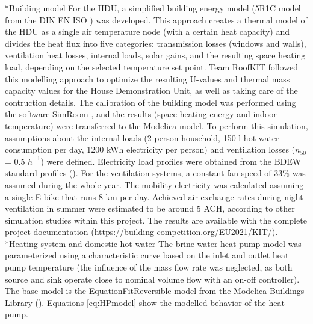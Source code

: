 \documentclass[twocolumn, a4paper,10pt]{article}
\makeatletter
\renewcommand\subsection{\@startsection{subsection}{1}{\z@}{\z@}{\z@}{\normalfont\normalsize\bfseries}}
\renewcommand\subsection{\@startsection{subsection}{1}{\z@}{\z@}{0.1pt}{\normalfont\normalsize\bfseries}}
\makeatother
\begin{document}
\subsection*{Building model}
For the HDU, a simplified building energy model (5R1C model from the DIN EN ISO \citet{DIN13790}) was developed. This approach creates a thermal model of the HDU as a single air temperature node (with a certain heat capacity) and divides the heat flux into five categories: transmission losses (windows and walls), ventilation heat losses, internal loads, solar gains, and the resulting space heating load, depending on the selected temperature set point. Team RoofKIT followed this modelling approach to optimize the resulting U-values and thermal mass capacity values for the House Demonstration Unit, as well as taking care of the contruction details. The calibration of the building model was performed using the software SimRoom \citeyear {SimRoom2022}, and the results (space heating energy and indoor temperature) were transferred to the Modelica model. To perform this simulation, assumptions about the internal loads (2-person household, 150 l hot water consumption per day, 1200 kWh electricity per person) and ventilation losses ($n_{50}$ = 0.5 $h^{-1}$) were defined. Electricity load profiles were obtained from the BDEW standard profiles (\citet{BDEW2002}). For the ventilation systems, a constant fan speed of 33\% was assumed during the whole year. The mobility electricity was calculated assuming a single E-bike that runs 8 km per day. Achieved air exchange rates during night ventilation in summer were estimated to be around 5 ACH, according to other simulation studies within this project. The results are available with the complete project documentation (\textcolor{blue}{\url{https://building-competition.org/EU2021/KIT/}}).\\

\subsection*{Heating system and domestic hot water}
The brine-water heat pump model was parameterized using a characteristic curve based on the inlet and outlet heat pump temperature (the influence of the mass flow rate was neglected, as both source and sink operate close to nominal volume flow with an on-off controller). The base model is the EquationFitReversible model from the Modelica Buildings Library (\cite{Wetter2014}). Equations \ref{eq:HPmodel} show the modelled behavior of the heat pump. 
\vspace{-5pt}
\end{document}
